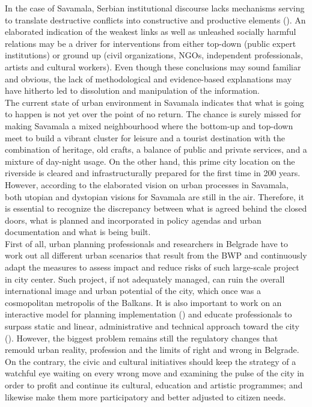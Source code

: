 \documentclass[11pt]{report}
\begin{document}
{In the case of Savamala, Serbian institutional discourse lacks mechanisms serving to translate destructive conflicts into constructive and productive elements (\href{Vujoseivc}{\cite{vujosevic_regionalizam_2015}}).
An elaborated indication of the weakest links as well as unleashed socially harmful relations may be a driver for interventions from either top-down (public expert institutions) or ground up (civil organizations, NGOs, independent professionals, artists and cultural workers).
Even though these conclusions may sound familiar and obvious, the lack of methodological and evidence-based explanations may have hitherto led to dissolution and manipulation of the information.
\\

The current state of urban environment in Savamala indicates that what is going to happen is not yet over the point of no return.
The chance is surely missed for making Savamala a mixed neighbourhood where the bottom-up and top-down meet to build a vibrant cluster for leisure and a tourist destination with the combination of heritage, old crafts, a balance of public and private services, and a mixture of day-night usage.
On the other hand, this prime city location on the riverside is cleared and infrastructurally prepared for the first time in 200 years.
However, according to the elaborated vision on urban processes in Savamala, both utopian and dystopian visions for Savamala are still in the air.
Therefore, it is essential to recognize the discrepancy between what is agreed behind the closed doors, what is planned and incorporated in policy agendas and urban documentation and what is being built.
\\

First of all, urban planning professionals and researchers in Belgrade have to work out all different urban scenarios that result from the BWP and continuously adapt the measures to assess impact and reduce risks of such large-scale project in city center.
Such project, if not adequately managed, can ruin the overall international image and urban potential of the city, which once was a cosmopolitan metropolis of the Balkans.
It is also important to work on an interactive model for planning implementation (\href{Alexander}{\cite{Alexander and Faludi 1989 ?????}}) and educate professionals to surpass static and linear, administrative and technical approach toward the city (\href{Stojkov}{\cite{stojkov_teorijska_2012}}).
However, the biggest problem remains still the regulatory changes that remould urban reality, profession and the limits of right and wrong in Belgrade.
On the contrary, the civic and cultural initiatives should keep the strategy of a watchful eye waiting on every wrong move and examining the pulse of the city in order to profit and continue its cultural, education and artistic programmes; and likewise make them more participatory and better adjusted to citizen needs.
\\

}
\end{document}
